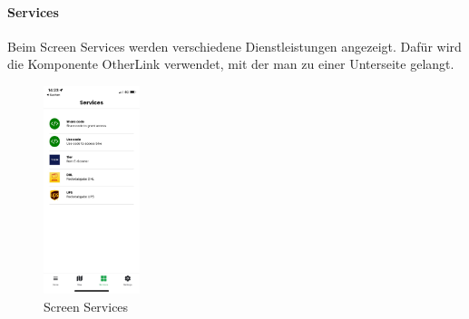 \paragraph{Services}Beim Screen Services werden verschiedene Dienstleistungen angezeigt. Dafür wird die Komponente OtherLink verwendet, mit der man zu einer Unterseite gelangt.\\
\begin{figure}[H]
  \centering
  \includegraphics[width=0.25\textwidth]{images/app-screenshots/screenservices.png}
  \caption{Screen Services}
  \label{fig:screenservices}
\end{figure}


